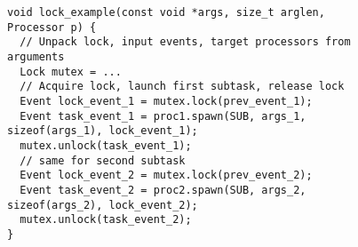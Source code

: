 \begin{figure}
\begin{lrbox}{\mylistingbox}
\begin{lstlisting}
void lock_example(const void *args, size_t arglen, Processor p) {
  // Unpack lock, input events, target processors from arguments
  Lock mutex = ...
  // Acquire lock, launch first subtask, release lock
  Event lock_event_1 = mutex.lock(prev_event_1);
  Event task_event_1 = proc1.spawn(SUB, args_1, sizeof(args_1), lock_event_1);
  mutex.unlock(task_event_1);
  // same for second subtask
  Event lock_event_2 = mutex.lock(prev_event_2);
  Event task_event_2 = proc2.spawn(SUB, args_2, sizeof(args_2), lock_event_2);
  mutex.unlock(task_event_2);
}
\end{lstlisting}
\end{lrbox}
\subfigure{\usebox{\mylistingbox}}\\

\centering
{}
\end{figure}
